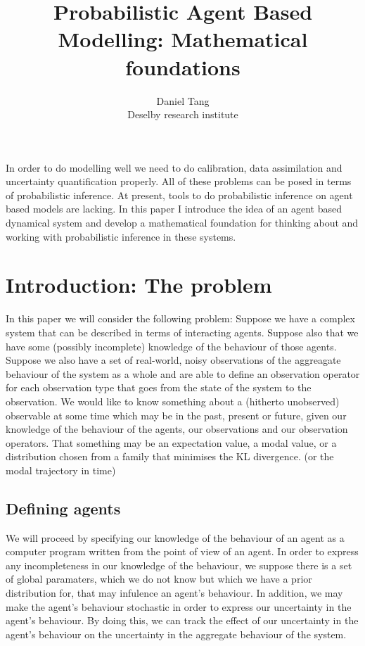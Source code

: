 \documentclass[letterpaper,twocolumn,10pt]{article}
\begin{document}
\title{\Large \bf Probabilistic Agent Based Modelling: Mathematical foundations}

\author{
{\rm Daniel Tang}\\
Deselby research institute
}

\maketitle


\abstract
In order to do modelling well we need to do calibration, data assimilation and uncertainty quantification properly. All of these problems can be posed in terms of probabilistic inference. At present, tools to do probabilistic inference on agent based models are lacking. In this paper I introduce the idea of an agent based dynamical system and develop a mathematical foundation for thinking about and working with probabilistic inference in these systems.

\section{Introduction: The problem}

In this paper we will consider the following problem: Suppose we have a complex system that can be described in terms of interacting agents. Suppose also that we have some (possibly incomplete) knowledge of the behaviour of those agents. Suppose we also have a set of real-world, noisy observations of the aggreagate behaviour of the system as a whole and are able to define an observation operator for each observation type that goes from the state of the system to the observation. We would like to know something about a (hitherto unobserved) observable at some time which may be in the past, present or future, given our knowledge of the behaviour of the agents, our observations and our observation operators. That something may be an expectation value, a modal value, or a distribution chosen from a family that minimises the KL divergence. (or the modal trajectory in time)

\subsection{Defining agents}
We will proceed by specifying our knowledge of the behaviour of an agent as a computer program written from the point of view of an agent. In order to express any incompleteness in our knowledge of the behaviour, we suppose there is a set of global paramaters, which we do not know but which we have a prior distribution for, that may  infulence an agent's behaviour. In addition, we may make the agent's behaviour stochastic in order to express our uncertainty in the agent's behaviour. By doing this, we can track the effect of our uncertainty in the agent's behaviour on the uncertainty in the aggregate behaviour of the system.
\end{document}

